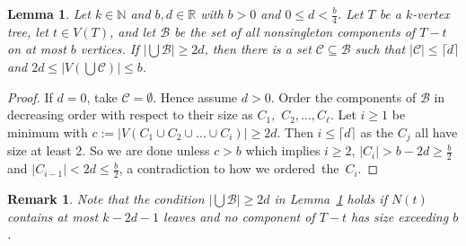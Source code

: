 \documentclass[12pt]{article}
\newtheorem{lemma}[theorem]{Lemma}
\newtheorem{remark}[theorem]{Remark}
\begin{document}

\begin{lemma}
\label{subsetofcompsofT2}
 Let $k\in\mathbb N$ and $b,d\in\mathbb R$  with $b>0$ and $0\le d< \frac b4$. Let $T$ be a $k$-vertex tree, let $t\in V(T)$, and let  
$\mathcal B$ be the set of all nonsingleton components of $T-t$ on at most  $b$ vertices. If $|\bigcup\mathcal B|\ge 2d$, 
 then there is a set  $\mathcal C\subseteq \mathcal B$   such that $|\mathcal C|\le \lceil d\rceil$ and $2d \le |V(\bigcup \mathcal C)|\le b$.
\end{lemma}
\begin{proof} 
If $d=0$, take $\mathcal C=\emptyset$. Hence assume $d>0$. 
Order the components of $\mathcal B$ in decreasing order with respect to their size as  $C_1,$ $C_2, \ldots, C_\ell$. 
 Let $i\ge 1$ be minimum with $c:=|V(C_1\cup C_2\cup\ldots\cup C_i)|\ge 2d$.  Then $i \le \lceil d\rceil$  as the $C_j$ all have size at least 2. 
  So we are done unless $c>b$ which implies  $i\ge 2$,
  $|C_i|>b-2d\ge\frac b2$ and $|C_{i-1}|<2d\le\frac b2$, a contradiction to how we ordered~the~$C_i$.
\end{proof}

\begin{remark}\label{theremark}
    Note that the condition $|\bigcup\mathcal B|\ge 2d$ in Lemma~\ref{subsetofcompsofT2} holds if $N(t)$ contains at most $k-2d-1$ leaves and no component of $T-t$ has size exceeding $b$. 
\end{remark}
\end{document}
